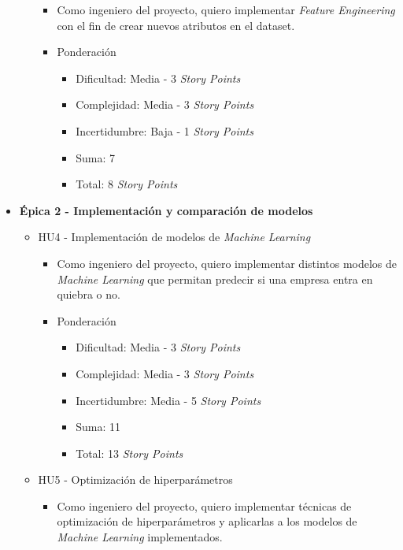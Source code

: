 \documentclass[
11pt, %
]{charter}
\begin{document}
\begin{itemize}
\begin{itemize}
        \begin{itemize}
            \item Como ingeniero del proyecto, quiero implementar \textit{Feature Engineering} con el fin de crear nuevos atributos en el dataset.
            \item Ponderación
            \begin{itemize}
                \item Dificultad: Media - 3 \textit{Story Points}
                \item Complejidad: Media - 3 \textit{Story Points}
                \item Incertidumbre: Baja - 1 \textit{Story Points}
                \item Suma: 7 
                \item Total: 8 \textit{Story Points}
            \end{itemize}
        \end{itemize}
    \end{itemize}
  \item \textbf{\'{E}pica 2 - Implementación y comparación de modelos}
    \begin{itemize}
      \item HU4 - Implementación de modelos de \textit{Machine Learning}
        \begin{itemize}
            \item Como ingeniero del proyecto, quiero implementar distintos modelos de \textit{Machine Learning} que permitan predecir si una empresa entra en quiebra o no.
            \item Ponderación
            \begin{itemize}
                \item Dificultad: Media - 3 \textit{Story Points}
                \item Complejidad: Media - 3 \textit{Story Points}
                \item Incertidumbre: Media - 5 \textit{Story Points}
                \item Suma: 11
                \item Total: 13 \textit{Story Points}
            \end{itemize}
        \end{itemize}
      \item HU5 - Optimización de hiperparámetros
        \begin{itemize}
            \item Como ingeniero del proyecto, quiero implementar técnicas de optimización de hiperparámetros y aplicarlas a los modelos de \textit{Machine Learning} implementados.

\end{itemize}
\end{itemize}
\end{itemize}
\end{document}
